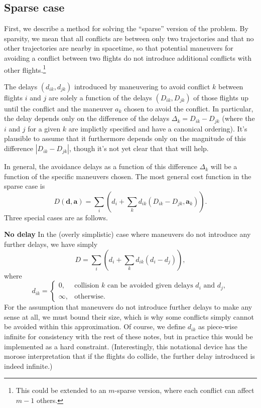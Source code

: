 \documentclass{article}
\begin{document}
\subsection{Sparse case}

First, we describe a method for solving the ``sparse'' version of the problem. 
By sparsity, we mean that all conflicts are between only two trajectories and that no other trajectories are nearby in spacetime, so that potential maneuvers for avoiding a conflict between two flights do not introduce additional conflicts with other flights.\footnote{This could be extended to an $m$-sparse version, where each conflict can affect $m-1$ others.}

The delays $(d_{ik}, d_{jk})$ introduced by maneuvering to avoid conflict $k$ between flights $i$ and $j$ are solely a function of the delays $(D_{ik}, D_{jk})$ of those flights up until the conflict and the maneuver $a_{k}$ chosen to avoid the conflict.
In particular, the delay depends only on the difference of the delays $\Delta_{k} = D_{ik} - D_{jk}$ (where the $i$ and $j$ for a given $k$ are implictly specified and have a canonical ordering).
It's plausible to assume that it furthermore depends only on the magnitude of this difference $|D_{ik} - D_{jk}|$, though it's not yet clear that that will help.

In general, the avoidance delays as a function of this difference $\Delta_{k}$ will be a function of the specific maneuvers chosen. 
The most general cost function in the sparse case is 
\begin{equation*}
D(\mathbf d, \mathbf a) 
=
\sum_i \left(d_i + \sum_k d_{ik} (D_{ik} - D_{jk}, \mathbf a_k)\right).
\end{equation*}
Three special cases are as follows. 

\noindent
\textbf{No delay}
In the (overly simplistic) case where maneuvers do not introduce any further delays, we have simply
\begin{equation*}
D = 
\sum_i
\left(d_i + \sum_k d_{ik}(d_i - d_j) \right),
\end{equation*}
where
\begin{equation*}
    d_{ik} = \begin{cases} 0, & \text{collision $k$ can be avoided given delays $d_i$ and $d_j$},\\
    \infty, & \text{otherwise}.
\end{cases}
\end{equation*}
For the assumption that maneuvers do not introduce further delays to make any sense at all, we must bound their size, which is why some conflicts simply cannot be avoided within this approximation.
Of course, we define $d_{ik}$ as piece-wise infinite for consistency with the rest of these notes, but in practice this would be implemented as a hard constraint.
(Interestingly, this notational device has the morose interpretation that if the flights do collide, the further delay introduced is indeed infinite.)
\end{document}
